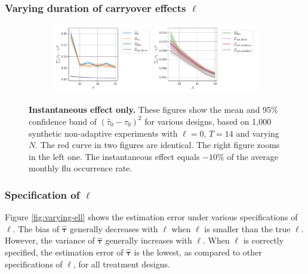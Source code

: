 \subsubsection{Varying duration of carryover effects $\ell$}\label{ecsub:varying-ell}

\begin{figure}[H]
	\centering
	\begin{subfigure}{1\textwidth}
		\centering
		\includegraphics[width=0.75\linewidth]{plots/empirical/flu/nonadaptive/flu_T_14_varying_N_lag_0_agg-2.pdf}
	\end{subfigure}
	\caption{\textbf{Instantaneous effect only.} 
 These figures show the mean and 95\% confidence band of $(\hat{\tau}_0 - \tau_0)^2$ for various designs, based on 1,000 synthetic non-adaptive experiments with $\ell = 0$, $T = 14$ and varying $N$. The red curve in two figures are identical. The right figure zooms in the left one. The instantaneous effect equals $-10$\% of the average monthly flu occurrence rate. }
	\label{fig:instantaneous-effect}
\end{figure}



\subsubsection{Specification of $\ell$}\label{ecsec:spec-ell}

Figure \ref{fig:varying-ell} shows the estimation error under various specifications of $\ell$. The bias of $\hat{\bm{\tau}}$ generally decreases with $\ell$ when $\ell$ is smaller than the true $\ell$. However, the variance of $\hat{\bm{\tau}}$ generally increases with $\ell$. When $\ell$ is correctly specified, the estimation error of $\hat{\bm{\tau}}$ is the lowest, as compared to other specifications of $\ell$, for all treatment designs. 

